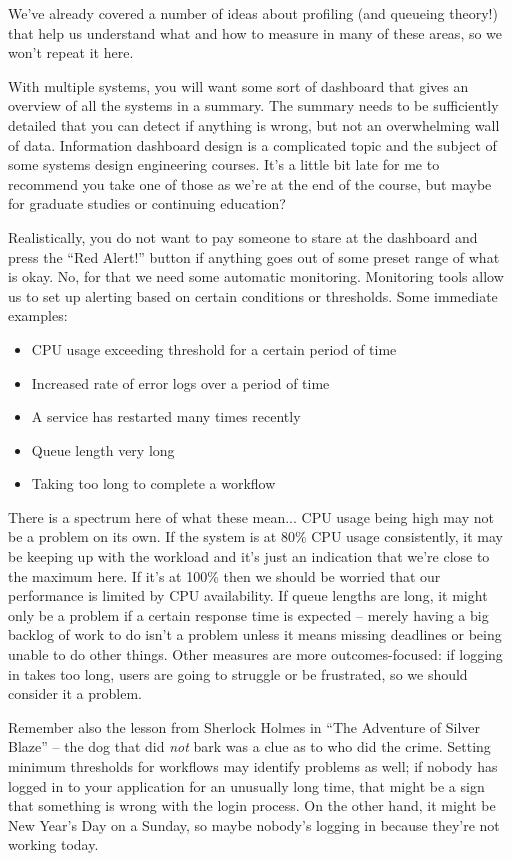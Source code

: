 We've already covered a number of ideas about profiling (and queueing theory!) that help us understand what and how to measure in many of these areas, so we won't repeat it here.

With multiple systems, you will want some sort of dashboard that gives an overview of all the systems in a summary. The summary needs to be sufficiently detailed that you can detect if anything is wrong, but not an overwhelming wall of data. Information dashboard design is a complicated topic and the subject of some systems design engineering courses. It's a little bit late for me to recommend you take one of those as we're at the end of the course, but maybe for graduate studies or continuing education?

Realistically, you do not want to pay someone to stare at the dashboard and press the ``Red Alert!'' button if anything goes out of some preset range of what is okay. No, for that we need some automatic monitoring. Monitoring tools allow us to set up alerting based on certain conditions or thresholds. Some immediate examples:
\begin{itemize}
	\item CPU usage exceeding threshold for a certain period of time
	\item Increased rate of error logs over a period of time
	\item A service has restarted many times recently
	\item Queue length very long
	\item Taking too long to complete a workflow
\end{itemize}



There is a spectrum here of what these mean... CPU usage being high may not be a problem on its own. If the system is at 80\% CPU usage consistently, it may be keeping up with the workload and it's just an indication that we're close to the maximum here. If it's at 100\% then we should be worried that our performance is limited by CPU availability. If queue lengths are long, it might only be a problem if a certain response time is expected -- merely having a big backlog of work to do isn't a problem unless it means missing deadlines or being unable to do other things. Other measures are more outcomes-focused: if logging in takes too long, users are going to struggle or be frustrated, so we should consider it a problem.

Remember also the lesson from Sherlock Holmes in ``The Adventure of Silver Blaze'' -- the dog that did \textit{not} bark was a clue as to who did the crime. Setting minimum thresholds for workflows may identify problems as well; if nobody has logged in to your application for an unusually long time, that might be a sign that something is wrong with the login process. On the other hand, it might be New Year's Day on a Sunday, so maybe nobody's logging in because they're not working today.

